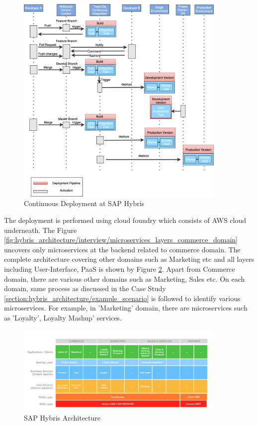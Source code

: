 \begin{figure}[H]
\begin{center}
\includegraphics[width=0.9\textwidth]{figures/hybris_architecture_continuous_deployment_flow}
\caption{Continuous Deployment at SAP Hybris}
\label{fig:hybris_architecture/interview/continuous_deployment_flow}
\end{center}
\end{figure}

The deployment is performed using cloud foundry which consists of \acrshort{AWS} cloud underneath.
The Figure \ref{fig:hybris_architecture/interview/microservices_layers_commerce_domain} uncovers only microservices at the backend related to commerce domain. The complete architecture covering other domains such as Marketing etc and all layers including User-Interface, \acrshort{PaaS} is shown by Figure \ref{fig:hybris_architecture/interview/hybris-architecture}. Apart from Commerce domain, there are various other domains such as Marketing, Sales etc. On each domain, same process as discussed in the Case Study \ref{section:hybris_architecture/example_scenario} is followed to identify various microservices. For example, in 'Marketing' domain, there are microservices such as 'Loyalty', Loyalty Mashup' services.
\\
\begin{figure}[H]
\begin{center}
\includegraphics[width=0.9\textwidth]{figures/hybris-architecture-five}
\caption{SAP Hybris Architecture}
\label{fig:hybris_architecture/interview/hybris-architecture}
\end{center}
\end{figure}

